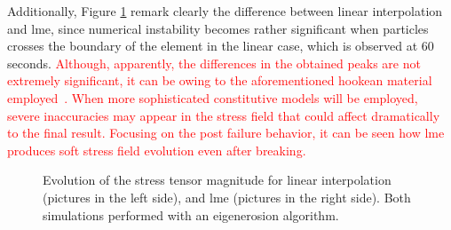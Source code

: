 \documentclass[preprint,12pt,a4paper]{elsarticle}
\newcommand{\PNA}[1]{
  \textcolor{red}{{#1}}
}
\begin{document}
Additionally, Figure \ref{fig:Stress-cracked-panel-mode-I}
remark clearly the difference between linear interpolation and
\acrshort{lme}, since numerical instability becomes rather significant
when particles crosses the boundary of the element in the linear
case, which is observed at 60 seconds. \PNA{Although, apparently, the
  differences in the obtained peaks are not extremely significant, it
  can be owing to the aforementioned hookean material
  employed~\cite{Zhang_EE_2020}. When more sophisticated constitutive
  models will be employed, severe inaccuracies may appear in the
  stress field that could affect dramatically to the final 
  result. Focusing on the post failure behavior, it can be seen how
  \acrshort{lme} produces soft stress field evolution even after
  breaking.} 
\begin{figure}
\centering
{}
\caption{Evolution of the stress tensor magnitude for linear
  interpolation (pictures in the left side), and \acrshort{lme}
  (pictures in the right side). Both simulations performed with an
  eigenerosion algorithm.}
\label{fig:Stress-cracked-panel-mode-I}
\end{figure}
\end{document}
